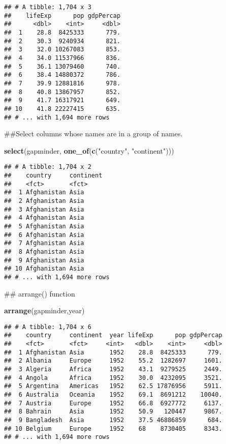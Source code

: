 \documentclass[]{article}
\newenvironment{Shaded}{\begin{snugshade}}{\end{snugshade}}
\newcommand{\KeywordTok}[1]{\textcolor[rgb]{0.13,0.29,0.53}{\textbf{#1}}}
\newcommand{\NormalTok}[1]{#1}
\newcommand{\StringTok}[1]{\textcolor[rgb]{0.31,0.60,0.02}{#1}}
\begin{document}
\begin{verbatim}
## # A tibble: 1,704 x 3
##    lifeExp      pop gdpPercap
##      <dbl>    <int>     <dbl>
##  1    28.8  8425333      779.
##  2    30.3  9240934      821.
##  3    32.0 10267083      853.
##  4    34.0 11537966      836.
##  5    36.1 13079460      740.
##  6    38.4 14880372      786.
##  7    39.9 12881816      978.
##  8    40.8 13867957      852.
##  9    41.7 16317921      649.
## 10    41.8 22227415      635.
## # ... with 1,694 more rows
\end{verbatim}

\begin{Shaded}
\begin{Highlighting}[]
\NormalTok{##Select columns whose names are in a group of names. }

\KeywordTok{select}\NormalTok{(gapminder, }\KeywordTok{one_of}\NormalTok{(}\KeywordTok{c}\NormalTok{(}\StringTok{"country"}\NormalTok{, }\StringTok{"continent"}\NormalTok{)))}
\end{Highlighting}
\end{Shaded}

\begin{verbatim}
## # A tibble: 1,704 x 2
##    country     continent
##    <fct>       <fct>    
##  1 Afghanistan Asia     
##  2 Afghanistan Asia     
##  3 Afghanistan Asia     
##  4 Afghanistan Asia     
##  5 Afghanistan Asia     
##  6 Afghanistan Asia     
##  7 Afghanistan Asia     
##  8 Afghanistan Asia     
##  9 Afghanistan Asia     
## 10 Afghanistan Asia     
## # ... with 1,694 more rows
\end{verbatim}

\begin{Shaded}
\begin{Highlighting}[]
\NormalTok{## arrange() function}

\KeywordTok{arrange}\NormalTok{(gapminder,year)}
\end{Highlighting}
\end{Shaded}

\begin{verbatim}
## # A tibble: 1,704 x 6
##    country     continent  year lifeExp      pop gdpPercap
##    <fct>       <fct>     <int>   <dbl>    <int>     <dbl>
##  1 Afghanistan Asia       1952    28.8  8425333      779.
##  2 Albania     Europe     1952    55.2  1282697     1601.
##  3 Algeria     Africa     1952    43.1  9279525     2449.
##  4 Angola      Africa     1952    30.0  4232095     3521.
##  5 Argentina   Americas   1952    62.5 17876956     5911.
##  6 Australia   Oceania    1952    69.1  8691212    10040.
##  7 Austria     Europe     1952    66.8  6927772     6137.
##  8 Bahrain     Asia       1952    50.9   120447     9867.
##  9 Bangladesh  Asia       1952    37.5 46886859      684.
## 10 Belgium     Europe     1952    68    8730405     8343.
## # ... with 1,694 more rows
\end{verbatim}
\end{document}
